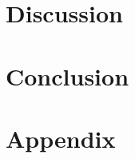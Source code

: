 \documentclass[12pt,a4paper,titlepage,oneside,english]{article}
\begin{document}
\section{Discussion}




\section{Conclusion}




\newpage
\setcounter{page}{1}
\onehalfspacing
{}



\section{Appendix}
\end{document}
